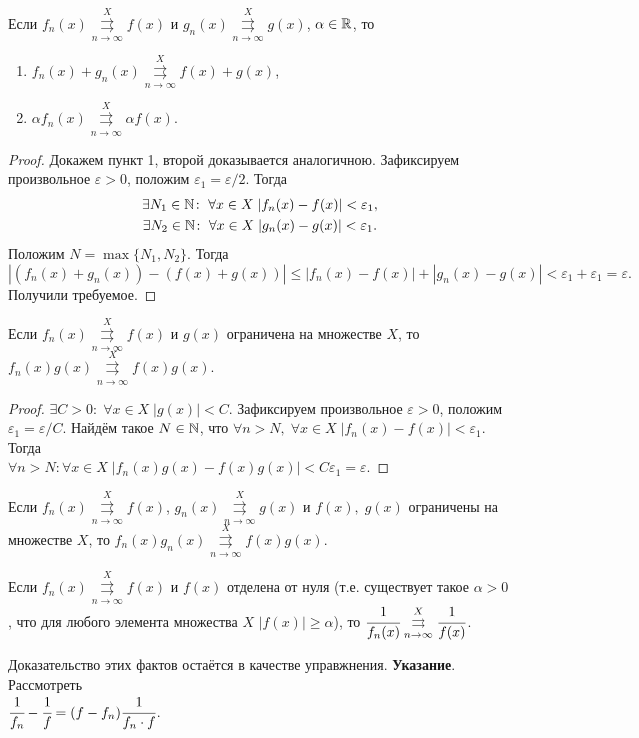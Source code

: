 \documentclass[a4paper, 12pt]{article}
\begin{document}
	\begin{Statement}
		Если $f_n(x) \overset{X}{\underset{n\to\infty}{\rightrightarrows}} f(x)$ и $g_n(x) \overset{X}{\underset{n\to\infty}{\rightrightarrows}} g(x)$, $\alpha \in \mathbb{R}$, то 
		\begin{enumerate}
			\item $f_n(x) + g_n(x) \overset{X}{\underset{n\to\infty}{\rightrightarrows}} f(x) + g(x)$,
			\item $\alpha f_n(x) \overset{X}{\underset{n\to\infty}{\rightrightarrows}} \alpha f(x)$.
		\end{enumerate}
	\end{Statement}
	\begin{proof}
		Докажем пункт 1, второй доказывается аналогичною. Зафиксируем произвольное $\varepsilon > 0$, положим $\varepsilon_1 = \varepsilon / 2$. Тогда
		\begin{gather*}
			\exists N_1 \in \mathbb{N}\colon \; \forall x\in X\; |f_n(x) - f(x) | < \varepsilon_1,\\
			\exists N_2 \in \mathbb{N}\colon \; \forall x\in X\; |g_n(x) - g(x) | < \varepsilon_1.\\
		\end{gather*}
		Положим $N = \max\{N_1, N_2\}$. Тогда
		$$
			|(f_n(x) + g_n(x)) - (f(x) + g(x))| \leqslant |f_n(x) - f(x)| + |g_n(x) - g(x)| < \varepsilon_1 + \varepsilon_1 = \varepsilon.
		$$
		Получили требуемое.
	\end{proof}
	\begin{Statement}
		Если $f_n(x)\overset{X}{\underset{n\to\infty}{\rightrightarrows}} f(x)$ и $g(x)$ ограничена на множестве $X$, то\\ $f_n(x)g(x) \overset{X}{\underset{n\to\infty}{\rightrightarrows}} f(x) g(x)$.
	\end{Statement}
	\begin{proof}
		$\exists C>0\colon\; \forall x\in X\; |g(x)| < C$. Зафиксируем произвольное $\varepsilon > 0$, положим $\varepsilon_1 = \varepsilon/C$. Найдём такое $N\in \mathbb{N}$, что 
		$\forall n>N,\; \forall x\in X\; |f_n(x) - f(x)| < \varepsilon_1$. Тогда \\$\forall n >N\colon \forall x\in X\; |f_n(x)g(x) - f(x)g(x)| < C\varepsilon_1 = \varepsilon$. 
	\end{proof}
	\begin{Comment}
		Если $f_n(x) \overset{X}{\underset{n\to\infty}{\rightrightarrows}} f(x)$, $g_n(x) \overset{X}{\underset{n\to\infty}{\rightrightarrows}} g(x)$ и $f(x),\; g(x)$ ограничены на множестве $X$, то $f_n(x)g_n(x)\overset{X}{\underset{n\to\infty}{\rightrightarrows}} f(x)g(x)$.
	\end{Comment}
	\begin{Comment}
		Если $f_n(x) \overset{X}{\underset{n\to\infty}{\rightrightarrows}} f(x)$ и $f(x)$ отделена от нуля (т.е. существует такое $\alpha>0$, что для любого элемента множества $X$ $|f(x)| \geqslant \alpha$), то $\cfrac{1}{f_n(x)} \overset{X}{\underset{n\to\infty}{\rightrightarrows}} \cfrac{1}{f(x)}$. 
	\end{Comment}
	Доказательство этих фактов остаётся в качестве управжнения. \textbf{Указание}. Рассмотреть \\$\cfrac{1}{f_n} - \cfrac{1}{f} = (f-f_n)\cfrac{1}{f_n\cdot f}$.
\end{document}
